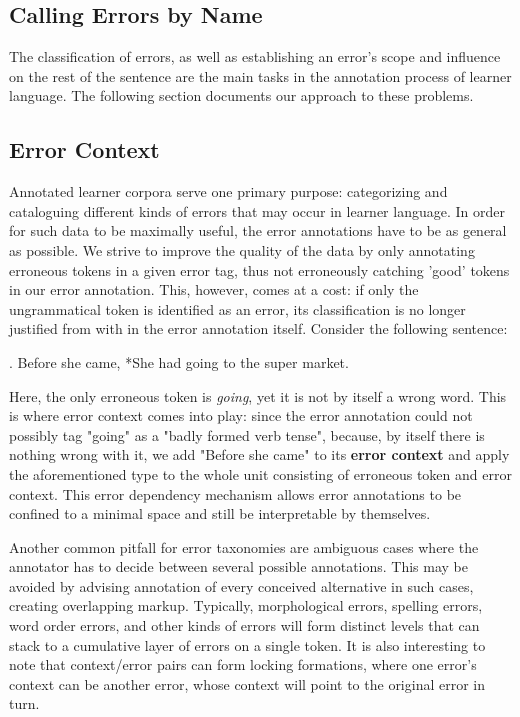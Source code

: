 \documentclass[12pt]{scrartcl}
\begin{document}
\subsection{Calling Errors by Name}\label{sec:taxonomy}

The classification of errors, as well as establishing an error's scope and 
influence on the rest of the sentence are the main tasks in the annotation
process of learner language. The following section documents our approach to
these problems.

\subsection{Error Context}

Annotated learner corpora serve one primary purpose: categorizing and
cataloguing different kinds of errors that may occur in learner language. In
order for such data to be maximally useful, the error annotations have to be as
general as possible. We strive to improve the quality of the data by only
annotating erroneous tokens in a given error tag, thus not erroneously catching
'good' tokens in our error annotation. This, however, comes at a cost: if only
the ungrammatical token is identified as an error, its classification is no
longer justified from with in the error annotation itself. Consider the
following sentence:

\ex. Before she came, *She had going to the super market.

Here, the only erroneous token is \textit{going}, yet it is not by itself a
wrong word. This is where error context comes into play: since the error
annotation could not possibly tag "going" as a "badly formed verb tense", because, by
itself there is nothing wrong with it, we add "Before she came" to its
\textbf{error context} and apply the aforementioned type to the whole unit
consisting of erroneous token and error context. This error dependency mechanism
allows error annotations to be confined to a minimal space and still be
interpretable by themselves.

Another common pitfall for error taxonomies are ambiguous cases where the
annotator has to decide between several possible annotations. This may be
avoided by advising annotation of every conceived alternative in such cases,
creating overlapping markup. Typically, morphological errors, spelling errors,
word order errors, and other kinds of errors will form distinct levels that can
stack to a cumulative layer of errors on a single token. It is also interesting
to note that context/error pairs can form locking formations, where one error's
context can be another error, whose context will point to the original error in
turn.
\end{document}
